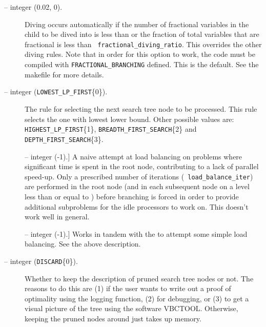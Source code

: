 \begin{description}
\label{fractional_diving}
\item[\ptt{fractional\_diving\_ratio, fractional\_diving\_num} --
integer (0.02, 0).]

Diving occurs automatically if the number of fractional variables in
the child to be dived into is less than 
or the fraction of total variables that are fractional is less than {\tt
fractional\_diving\_ratio}. This overrides the other diving rules.
Note that in order for this option to work, the code must be compiled
with {\tt FRACTIONAL\_BRANCHING} defined. This is the default. See the
makefile for more details.

\item[\ptt{node\_selection\_rule} -- integer ({\tt LOWEST\_LP\_FIRST}\{0\}).] 
The rule for selecting the next search tree node to be processed. This rule
selects the one with lowest lower bound. Other possible values are: {\tt
HIGHEST\_LP\_FIRST}\{1\}, {\tt BREADTH\_FIRST\_SEARCH}\{2\} and {\tt
DEPTH\_FIRST\_SEARCH}\{3\}.

\item[\ptt{load\_balance\_level}] -- integer (-1).] 
A naive attempt at load balancing on problems where significant time
is spent in the root node, contributing to a lack of parallel
speed-up. Only a prescribed number of iterations ({\tt
load\_balance\_iter}) are performed in the root node (and in each
subsequent node on
a level less than or equal to ) before
branching is forced in order to provide additional subproblems for the
idle processors to work on. This doesn't work well in general.

\item[\ptt{load\_balance\_iter}] -- integer (-1).] 
Works in tandem with the  to attempt some
simple load balancing. See the above description.

\item[\ptt{keep\_description\_of\_pruned} -- integer ({\tt DISCARD}\{0\}).] 
Whether to keep the description of pruned search tree nodes or not.
The reasons to do this are (1) if the user wants to write out a proof
of optimality using the logging function, (2) for debugging, or (3) to
get a visual picture of the tree using the software VBCTOOL.
Otherwise, keeping the pruned nodes around just takes up memory. 


\end{description}
